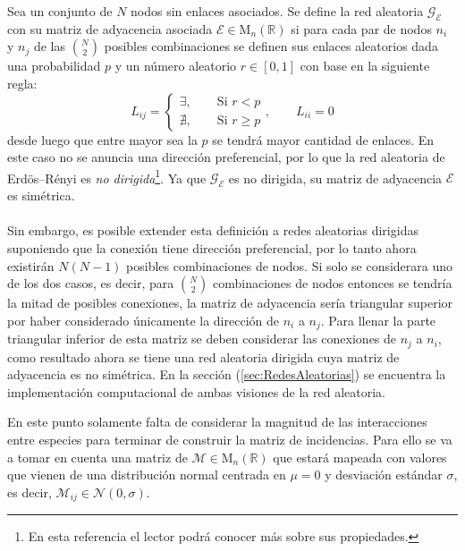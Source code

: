 \begin{definición}\label{def:redAleatoria}
	Sea un conjunto de $N$ nodos sin enlaces asociados. Se define la red aleatoria $\mathcal{G}_\mathcal{E}$ con su matriz de adyacencia asociada $\mathcal{E}\in\mathrm{M}_n(\mathbb{R})$ si para cada par de nodos $n_i$ y $n_j$ de las $\binom{N}{2}$ posibles combinaciones se definen sus enlaces aleatorios dada una probabilidad $p$ y un número aleatorio $r\in[0,1]$ con base en la siguiente regla:
	$$
	L_{ij}=\begin{cases}
		\exists,\qquad\text{Si }r<p\\
		\nexists,\qquad\text{Si }r\geq p
	\end{cases},\qquad L_{ii}=0
	$$
	desde luego que entre mayor sea la $p$ se tendrá mayor cantidad de enlaces. En este caso no se anuncia una dirección preferencial, por lo que la red aleatoria de Erdös–Rényi es \textit{no dirigida}\footnote{En esta referencia \cite{posfai2016network} el lector podrá conocer más sobre sus propiedades.}. Ya que $\mathcal{G}_\mathcal{E}$ es no dirigida, su matriz de adyacencia $\mathcal{E}$ es simétrica. \\
	\\
	Sin embargo, es posible extender esta definición a redes aleatorias dirigidas suponiendo que la conexión tiene dirección preferencial, por lo tanto ahora existirán $N(N-1)$ posibles combinaciones de nodos. Si solo se considerara uno de los dos casos, es decir, para $\binom{N}{2}$ combinaciones de nodos entonces se tendría la mitad de posibles conexiones, la matriz de adyacencia sería triangular superior por haber considerado únicamente la dirección de $n_i$ a $n_j$. Para llenar la parte triangular inferior de esta matriz se deben considerar las conexiones de $n_j$ a $n_i$, como resultado ahora se tiene una red aleatoria dirigida cuya matriz de adyacencia es no simétrica. En la sección (\ref{sec:RedesAleatorias}) se encuentra la implementación computacional de ambas visiones de la red aleatoria.
\end{definición}
\setlength{\parindent}{0cm}En este punto solamente falta de considerar la magnitud de las interacciones entre especies para terminar de construir la matriz de incidencias. Para ello se va a tomar en cuenta una matriz de $\mathcal{M}\in\mathrm{M}_n(\mathbb{R})$ que estará mapeada con valores que vienen de una distribución normal centrada en $\mu=0$ y desviación estándar $\sigma$, es decir, $\mathcal{M}_{ij}\in\mathcal{N}(0,\sigma)$.
